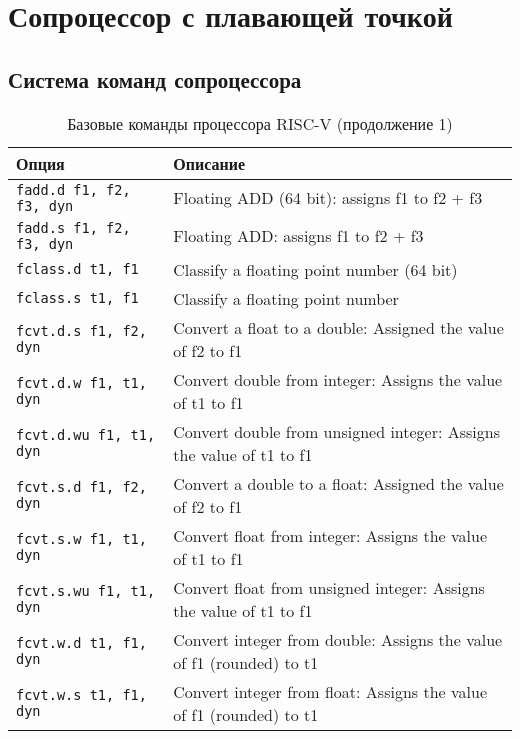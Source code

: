 \chapter{Сопроцессор с плавающей точкой}

\section{Система команд сопроцессора}


\begin{table}[h]
    \caption{Базовые команды процессора RISC-V (продолжение 1)}
    \centering
    \begin{tabularx}{\textwidth}{|l|X|}
        \hline
        \textbf{Опция} & \textbf{Описание} \\
        \hline \hline
        \hline \verb|fadd.d f1, f2, f3, dyn| & Floating ADD (64 bit): assigns f1 to f2 + f3 \\
        \hline \verb|fadd.s f1, f2, f3, dyn| & Floating ADD: assigns f1 to f2 + f3 \\
        \hline \verb|fclass.d t1, f1| & Classify a floating point number (64 bit) \\
        \hline \verb|fclass.s t1, f1| & Classify a floating point number \\
        \hline \verb|fcvt.d.s f1, f2, dyn| & Convert a float to a double: Assigned the value of f2 to f1 \\
        \hline \verb|fcvt.d.w f1, t1, dyn| & Convert double from integer: Assigns the value of t1 to f1 \\
        \hline \verb|fcvt.d.wu f1, t1, dyn| & Convert double from unsigned integer: Assigns the value of t1 to f1 \\
        \hline \verb|fcvt.s.d f1, f2, dyn| & Convert a double to a float: Assigned the value of f2 to f1 \\
        \hline \verb|fcvt.s.w f1, t1, dyn| & Convert float from integer: Assigns the value of t1 to f1 \\
        \hline \verb|fcvt.s.wu f1, t1, dyn| & Convert float from unsigned integer: Assigns the value of t1 to f1 \\
        \hline \verb|fcvt.w.d t1, f1, dyn| & Convert integer from double: Assigns the value of f1 (rounded) to t1 \\
        \hline \verb|fcvt.w.s t1, f1, dyn| & Convert integer from float: Assigns the value of f1 (rounded) to t1 \\

\end{tabularx}
\end{table}

